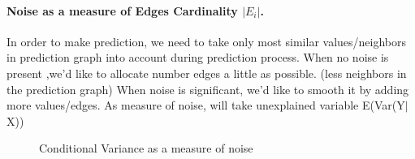 \documentclass[a4paper]{article}
\begin{document}

\paragraph{Noise as a measure of Edges Cardinality $|E_i|$.} 
In order to make prediction, we need to take only most similar values/neighbors in prediction graph into account during prediction process.
When no noise is present ,we'd like to allocate number edges a little as possible.
(less neighbors in the prediction graph)
When noise is significant, we'd like to smooth it by adding more values/edges.
As measure of noise, will take unexplained variable E(Var(Y$\mid$ X))\\

\begin{figure}[ht]
\centering
{}
\centering
{}
\caption[Optional caption for list of figures]{Conditional Variance as a measure of noise
 }
\label{fig:subfigureExample}
\end{figure}
\end{document}
